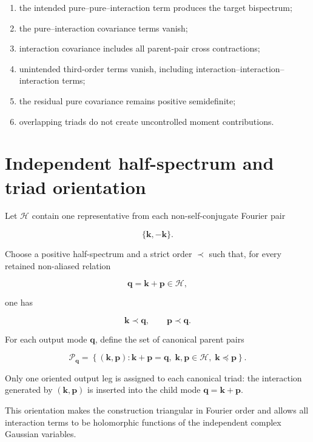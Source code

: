 \documentclass[
  11pt,
  a4paper,
]{article}
\providecommand{\tightlist}{%
  \setlength{\itemsep}{0pt}\setlength{\parskip}{0pt}}
\begin{document}
\begin{enumerate}
\def\labelenumi{\arabic{enumi}.}
\tightlist
\item
  the intended pure--pure--interaction term produces the target
  bispectrum;
\item
  the pure--interaction covariance terms vanish;
\item
  interaction covariance includes all parent-pair cross contractions;
\item
  unintended third-order terms vanish, including
  interaction--interaction--interaction terms;
\item
  the residual pure covariance remains positive semidefinite;
\item
  overlapping triads do not create uncontrolled moment contributions.
\end{enumerate}

\section{Independent half-spectrum and triad
orientation}\label{independent-half-spectrum-and-triad-orientation}

Let \(\mathcal H\) contain one representative from each
non-self-conjugate Fourier pair

\[
\{\boldsymbol k,-\boldsymbol k\}.
\]

Choose a positive half-spectrum and a strict order \(\prec\) such that,
for every retained non-aliased relation

\[
\boldsymbol q=\boldsymbol k+\boldsymbol p\in\mathcal H,
\]

one has

\[
\boldsymbol k\prec\boldsymbol q,
\qquad
\boldsymbol p\prec\boldsymbol q.
\]

For each output mode \(\boldsymbol q\), define the set of canonical
parent pairs

\[
\mathcal P_{\boldsymbol q}
=
\left\{
(\boldsymbol k,\boldsymbol p):
\boldsymbol k+\boldsymbol p=\boldsymbol q,\;
\boldsymbol k,\boldsymbol p\in\mathcal H,\;
\boldsymbol k\preceq\boldsymbol p
\right\}.
\]

Only one oriented output leg is assigned to each canonical triad: the
interaction generated by \((\boldsymbol k,\boldsymbol p)\) is inserted
into the child mode \(\boldsymbol q=\boldsymbol k+\boldsymbol p\).

This orientation makes the construction triangular in Fourier order and
allows all interaction terms to be holomorphic functions of the
independent complex Gaussian variables.
\end{document}
